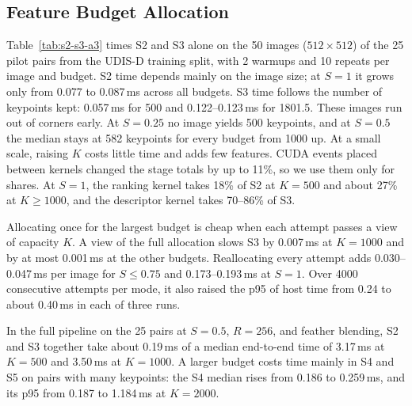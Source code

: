 \subsection{Feature Budget Allocation}
\label{sec:feature-budget}
\begin{table}[t]
\centering
\caption{S2 and S3 on one T4 for one image, median over the 50 images of the
25 pilot pairs (ms), for $S\in\{0.5,1\}$. ``kept'' is the median number of
keypoints returned. $\Delta$S3~max is the S3 time with a keypoint view of
capacity $K_{\max}=4000$ minus the time with capacity $K$. $\Delta$host~realloc
is the host time of an attempt that frees and reallocates all S2/S3 buffers
minus that of an attempt using buffers allocated once.}
\label{tab:s2-s3-a3}
\small

\end{table}
Table~\ref{tab:s2-s3-a3} times S2 and S3 alone on the 50 images
($512\times512$) of the 25 pilot pairs from the UDIS-D training split, with 2
warmups and 10 repeats per image and budget. S2 time depends mainly on the
image size; at $S=1$ it grows only from 0.077 to 0.087\,ms across all budgets.
S3 time follows the number of keypoints kept: 0.057\,ms for 500 and
0.122--0.123\,ms for 1801.5. These images run out of corners early. At
$S=0.25$ no image yields 500 keypoints, and at $S=0.5$ the median stays at 582
keypoints for every budget from 1000 up. At a small scale, raising $K$ costs
little time and adds few features. CUDA events placed between kernels changed
the stage totals by up to 11\%, so we use them only for shares. At $S=1$, the
ranking kernel takes 18\% of S2 at $K=500$ and about 27\% at $K\ge1000$, and
the descriptor kernel takes 70--86\% of S3.

Allocating once for the largest budget is cheap when each attempt passes a view
of capacity $K$. A view of the full allocation slows S3 by 0.007\,ms at
$K=1000$ and by at most 0.001\,ms at the other budgets. Reallocating every
attempt adds 0.030--0.047\,ms per image for $S\le0.75$ and 0.173--0.193\,ms at
$S=1$. Over 4000 consecutive attempts per mode, it also raised the p95 of host
time from 0.24 to about 0.40\,ms in each of three runs.

In the full pipeline on the 25 pairs at $S=0.5$, $R=256$, and feather blending,
S2 and S3 together take about 0.19\,ms of a median end-to-end time of 3.17\,ms
at $K=500$ and 3.50\,ms at $K=1000$. A larger budget costs time mainly in S4
and S5 on pairs with many keypoints: the S4 median rises from 0.186 to
0.259\,ms, and its p95 from 0.187 to 1.184\,ms at $K=2000$.
